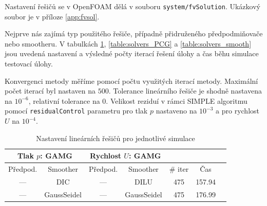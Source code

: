 \documentclass[a4paper,12pt]{report}
\theoremstyle{remark}
\begin{document}
Nastavení řešičů se v OpenFOAM dělá v souboru \texttt{system/fvSolution}. Ukázkový soubor je v příloze \ref{app:fvsol}.
	
 Nejprve nás zajímá typ použitého řešiče, případně přidruženého předpodmiňovače nebo smootheru. V tabulkách \ref{table:solvers_GAMG}, \ref{table:solvers_PCG} a \ref{table:solvers_smooth} jsou uvedená nastavení a výsledné počty iterací řešení úlohy a čas běhu simulace testovací úlohy.
 
 Konvergenci metody měříme pomocí počtu využitých iterací metody. Maximální počet iterací byl nastaven na $500$. Tolerance lineárního řešiče je shodně nastavena na $10^{-6}$, relativní tolerance na $0$. Velikost reziduí v rámci SIMPLE algoritmu pomocí \texttt{residualControl} parametru pro tlak $p$ nastaveno na $10^{-3}$ a pro rychlost $U$ na $10^{-4}$.

 \begin{table}[H]
	\centering
	\caption{Nastavení lineárních řešičů pro jednotlivé simulace}
	\renewcommand{\arraystretch}{1.9}
	\begin{tabular}{*7c}
		\toprule
		\multicolumn{2}{c}{Tlak $p$: \textbf{GAMG}} & \multicolumn{2}{c}{Rychlost $U$: \textbf{GAMG}}\\		
		\midrule
		Předpod.&Smoother&Předpod.&Smoother&\# iter&Čas\\
		\midrule
 --- & DIC & --- &  DILU & 475 &157.94\\		
 --- & GaussSeidel &  --- & GaussSeidel & 475&176.99\\
		
			\bottomrule
\end{tabular}

\label{table:solvers_GAMG}

\end{table}
\end{document}
